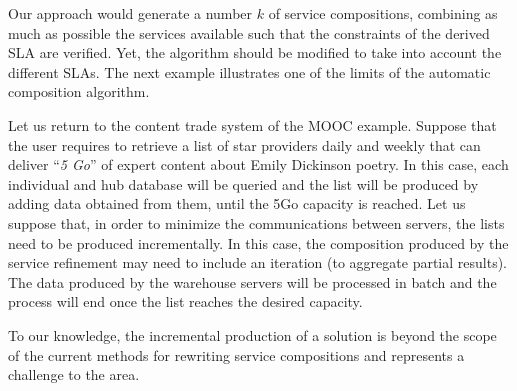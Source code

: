 Our approach would generate a number $k$ of service compositions, combining as much as possible the services available such that the constraints of the derived SLA are verified. 
 Yet, the algorithm should be modified to take into account the different SLAs. The next example illustrates one of the limits of the automatic composition algorithm.

\color{red}
\begin{example}\label{Ex:rew2}
Let us return to the content  trade system of the MOOC example.
 Suppose that the user requires to retrieve a list of star providers  daily and weekly that can deliver ``\textit{5 Go}'' of expert content about Emily Dickinson poetry.
In this case, each individual and hub database will be queried and the list will be produced by adding data obtained from them, until the 5Go  capacity is reached.
Let us suppose that, in order to minimize the  communications between servers, the lists need to be produced incrementally.
In this case, the composition produced by the service refinement may need to include an iteration (to aggregate partial results). 
The data produced by the warehouse servers will be processed in batch and the process will end once the list reaches the desired capacity.

To our knowledge, the incremental production of a solution is beyond  the scope of the current methods for rewriting service compositions and represents a challenge to the area.
~\hfill\openbox
\end{example}

\color{black}

 
   
 
